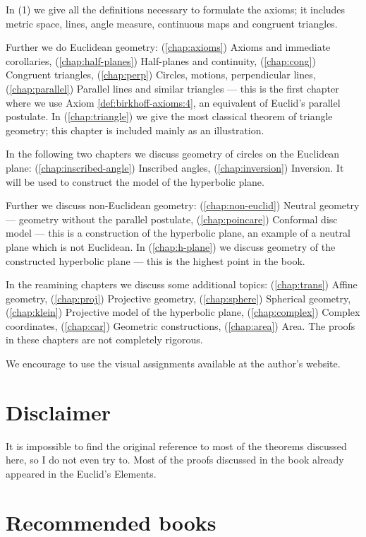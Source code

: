 \smallskip

In (1) we give all the definitions necessary to formulate the axioms;
it includes metric space, 
lines, 
angle measure, 
continuous maps and congruent triangles.

Further we do Euclidean geometry:
(\ref{chap:axioms}) Axioms and immediate corollaries,
(\ref{chap:half-planes}) Half-planes and continuity,
(\ref{chap:cong}) Congruent triangles,
(\ref{chap:perp}) Circles, motions, perpendicular lines,
(\ref{chap:parallel}) Parallel lines and similar triangles
--- this is the first chapter where we use Axiom \ref{def:birkhoff-axioms:4}, an equivalent of Euclid's parallel postulate.
In (\ref{chap:triangle}) we give the most classical theorem of triangle geometry;
this chapter is included mainly as an illustration.


In the following two chapters we discuss geometry of circles on the Euclidean plane:
(\ref{chap:inscribed-angle}) Inscribed angles, (\ref{chap:inversion}) Inversion.
It  will be used to construct the model of the hyperbolic plane.

Further 
we discuss non-Euclidean geometry:
(\ref{chap:non-euclid})
Neutral geometry --- geometry without the parallel postulate,
(\ref{chap:poincare})
Conformal disc model ---
this is a construction of the hyperbolic plane,
an example of a neutral plane which is not Euclidean.
In (\ref{chap:h-plane}) we discuss geometry of the constructed hyperbolic plane --- this is the highest point in the book.

In the reamining chapters we discuss some additional topics:
(\ref{chap:trans}) Affine geometry,
(\ref{chap:proj}) Projective geometry,
(\ref{chap:sphere}) Spherical geometry, 
(\ref{chap:klein}) Projective model of the hyperbolic plane,
(\ref{chap:complex}) Complex coordinates,
(\ref{chap:car}) Geometric constructions,
(\ref{chap:area}) Area.
The proofs in these chapters are not completely rigorous.

We encourage to use the visual assignments available at the author's website.

\section*{Disclaimer}

It is  impossible to find the original reference to most of the theorems discussed here, so I do not even try to.
Most of the proofs discussed in the book 
already appeared in the Euclid's Elements.

\section*{Recommended books}

